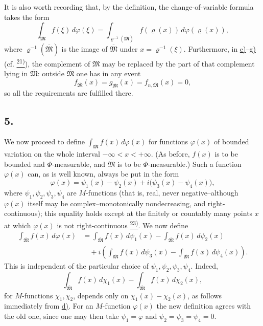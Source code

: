 \documentclass[12pt,b5paper,twoside]{article}
\newcommand{\noteref}[1]{%
  \hyperlink{note:#1}{\textsuperscript{#1)}}}
\begin{document}
It is also worth recording that, by the definition, the change-of-variable formula takes the form
\label{eq:LS-change-restricted}
\begin{equation*}
 \int_{\overline{\mathfrak M}}f(\xi)\,d\varphi(\xi)
 =\int_{\varrho^{-1}(\overline{\mathfrak M})}
 f(\varrho(x))\,d\varphi(\varrho(x)),
\end{equation*}
where $\varrho^{-1}(\overline{\mathfrak M})$ is the image of $\overline{\mathfrak M}$ under $x=\varrho^{-1}(\xi)$. Furthermore, in \hyperref[prop:I.4.e]{e)}--\hyperref[prop:I.4.g]{g)} (cf. \noteref{21}), the complement of $\mathfrak M$ may be replaced by the part of that complement lying in $\overline{\mathfrak M}$: outside $\overline{\mathfrak M}$ one has in any event
\[
 f_{\overline{\mathfrak M}}(x)
 =g_{\overline{\mathfrak M}}(x)
 =f_{n,\overline{\mathfrak M}}(x)=0,
\]
so all the requirements are fulfilled there.

\subsection*{5.}
\label{sec:I.5}
We now proceed to define $\int_{\overline{\mathfrak M}}f(x)\,d\varphi(x)$ for functions $\varphi(x)$ of bounded variation on the whole interval $-\infty<x<+\infty$. (As before, $f(x)$ is to be bounded and $\Phi$-measurable, and $\overline{\mathfrak M}$ is to be $\Phi$-measurable.) Such a function $\varphi(x)$ can, as is well known, always be put in the form
\label{eq:BV-decomposition}
\begin{equation*}
 \varphi(x)=\psi_1(x)-\psi_2(x)
 +i\bigl(\psi_3(x)-\psi_4(x)\bigr),
\end{equation*}
where $\psi_1,\psi_2,\psi_3,\psi_4$ are $M$-functions (that is, real, never negative--although $\varphi(x)$ itself may be complex--monotonically nondecreasing, and right-continuous); this equality holds
except at the finitely or countably many points $x$ at which $\varphi(x)$ is not right-continuous\noteref{23}. We now define
\label{eq:LS-BV-definition}
\begin{align*}
 \int_{\overline{\mathfrak M}}f(x)\,d\varphi(x)
 &={}
 \int_{\overline{\mathfrak M}}f(x)\,d\psi_1(x)
 -\int_{\overline{\mathfrak M}}f(x)\,d\psi_2(x)\\
 &\quad
 +i\left(
 \int_{\overline{\mathfrak M}}f(x)\,d\psi_3(x)
 -\int_{\overline{\mathfrak M}}f(x)\,d\psi_4(x)
 \right).
\end{align*}
This is independent of the particular choice of $\psi_1,\psi_2,\psi_3,\psi_4$. Indeed,
\[
 \int_{\overline{\mathfrak M}}f(x)\,d\chi_1(x)
 -\int_{\overline{\mathfrak M}}f(x)\,d\chi_2(x),
\]
for $M$-functions $\chi_1,\chi_2$, depends only on $\chi_1(x)-\chi_2(x)$, as follows immediately from \hyperref[prop:I.4.d]{d)}. For an $M$-function $\varphi(x)$ the new definition agrees with the old one, since one may then take $\psi_1=\varphi$ and $\psi_2=\psi_3=\psi_4=0$.
\end{document}
